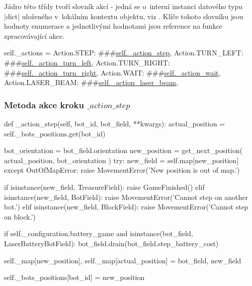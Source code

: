 Jádro této třídy tvoří slovník akcí - jedná se o~interní instanci datového typu \ic|dict| uloženého v~lokálním kontextu objektu, viz . Klíče tohoto slovníku jsou hodnoty enumerace  a jednotlivými hodnotami jsou reference na funkce zpracovávající akce.
\\
{
\lstset{belowcaptionskip=3pt,belowskip=3pt,aboveskip=-10pt}

\begin{code}[caption={Slovník akcí ve třídě $Game$},label={lst:game-actions}]
self._actions = {
    Action.STEP: ###\hyperref[subsubsec:method-action-step]{self.\_action\_step},
    Action.TURN_LEFT: ###\hyperref[subsubsec:method-action-turn-left]{self.\_action\_turn\_left},
    Action.TURN_RIGHT: ###\hyperref[subsubsec:method-action-turn-right]{self.\_action\_turn\_right},
    Action.WAIT: ###\hyperref[subsubsec:method-action-wait]{self.\_action\_wait},
    Action.LASER_BEAM: ###\hyperref[subsubsec:method-action-laser-beam]{self.\_action\_laser\_beam},
}	
\end{code}

\subsubsection{Metoda akce kroku $\_action\_step$}
\label{subsubsec:method-action-step}
\begin{code}[caption={Metoda $Game.\_action\_step$},label={lst:game-action-step}]
def _action_step(self, bot_id, bot_field, **kwargs):
    actual_position = self._bots_positions.get(bot_id)

    bot_orientation = bot_field.orientation
    new_position = get_next_position(
        actual_position,
        bot_orientation
    )
    try:
        new_field = self.map[new_position]
    except OutOfMapError:
        raise MovementError('New position is out of map.')

    if isinstance(new_field, TreasureField):
        raise GameFinished()
    elif isinstance(new_field, BotField):
        raise MovementError('Cannot step on another bot.')
    elif isinstance(new_field, BlockField):
        raise MovementError('Cannot step on block.')

    if self._configuration.battery_game and isinstance(bot_field, LaserBatteryBotField):
        bot_field.drain(bot_field.step_battery_cost)

    self._map[new_position], self._map[actual_position] = bot_field, new_field

    self._bots_positions[bot_id] = new_position
\end{code}

}
